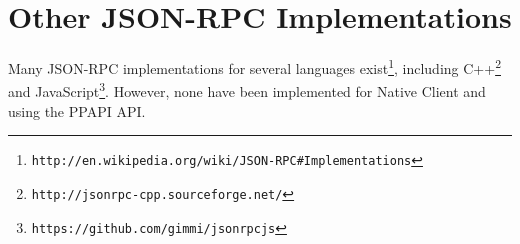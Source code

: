 \section{Other JSON-RPC Implementations} %
\label{sec:json_rpc_implementations}
Many JSON-RPC implementations for several languages exist\footnote{\lstinline+http://en.wikipedia.org/wiki/JSON-RPC#Implementations+}, including C++\footnote{\lstinline+http://jsonrpc-cpp.sourceforge.net/+} and JavaScript\footnote{\lstinline+https://github.com/gimmi/jsonrpcjs+}. However, none have been implemented for Native Client and using the PPAPI API.
